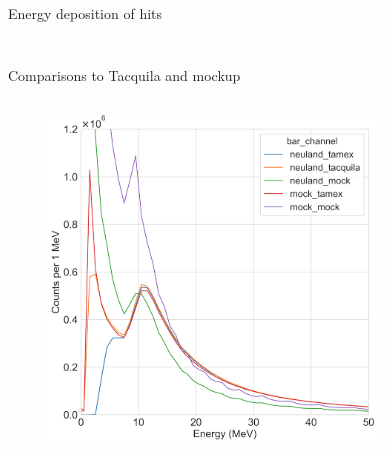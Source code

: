 \documentclass[compress, 13pt, aspectratio=169]{beamer}
\begin{document}
\begin{frame}{Energy deposition of hits}
\begin{columns}
\begin{column}{0.5\textwidth}
\begin{figure}[t]
            \end{figure}
        \end{column}
    \end{columns}
\end{frame}

\begin{frame}{Comparisons to Tacquila and mockup}
    \vspace*{-0.6cm}
    \begin{columns}
        \begin{column}{0.5\textwidth}
            \begin{figure}[t]
                \includegraphics[keepaspectratio, width = 0.9\textwidth]{Plots/EHitAll_E1_4n.png}%
            \end{figure}
        \end{column}
        \begin{column}{0.5\textwidth}
            \begin{figure}[t]

\end{figure}
\end{column}
\end{columns}
\end{frame}
\end{document}

